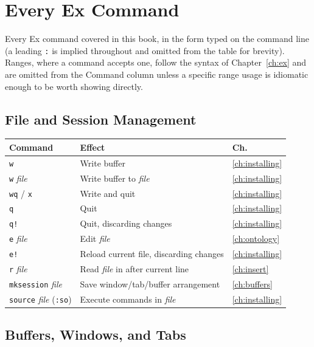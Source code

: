 \chapter{Every Ex Command}
\label{app:ex}

Every Ex command covered in this book, in the form typed on the command line (a leading \texttt{:} is implied throughout and omitted from the table for brevity). Ranges, where a command accepts one, follow the syntax of Chapter~\ref{ch:ex} and are omitted from the Command column unless a specific range usage is idiomatic enough to be worth showing directly.

\section{File and Session Management}

\begin{longtable}{@{}l p{9cm} l@{}}
\textbf{Command} & \textbf{Effect} & \textbf{Ch.} \\
\hline
\endhead
\texttt{w} & Write buffer & \ref{ch:installing} \\
\texttt{w} \textit{file} & Write buffer to \textit{file} & \ref{ch:installing} \\
\texttt{wq} / \texttt{x} & Write and quit & \ref{ch:installing} \\
\texttt{q} & Quit & \ref{ch:installing} \\
\texttt{q!} & Quit, discarding changes & \ref{ch:installing} \\
\texttt{e} \textit{file} & Edit \textit{file} & \ref{ch:ontology} \\
\texttt{e!} & Reload current file, discarding changes & \ref{ch:installing} \\
\texttt{r} \textit{file} & Read \textit{file} in after current line & \ref{ch:insert} \\
\texttt{mksession} \textit{file} & Save window/tab/buffer arrangement & \ref{ch:buffers} \\
\texttt{source} \textit{file} (\texttt{:so}) & Execute commands in \textit{file} & \ref{ch:installing} \\
\end{longtable}

\section{Buffers, Windows, and Tabs}

